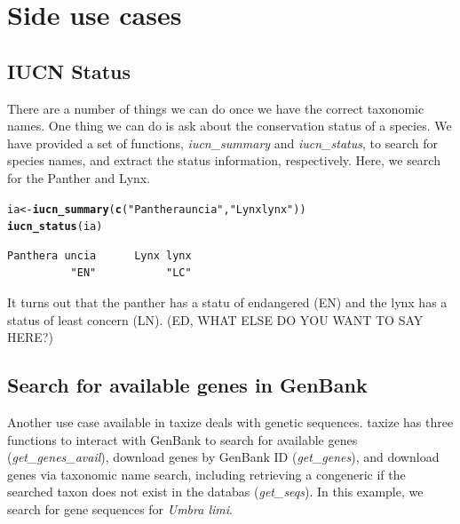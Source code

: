 \documentclass[letterpaper,superscriptaddress,showkeys,longbibliography,10pt]{revtex4-1}\usepackage{graphicx, color}
\makeatletter
\newcommand{\hlfunctioncall}[1]{\textcolor[rgb]{0.501960784313725,0,0.329411764705882}{\textbf{#1}}}%
\newcommand{\hlstring}[1]{\textcolor[rgb]{0.6,0.6,1}{#1}}%
\newenvironment{kframe}{%
 \def\at@end@of@kframe{}%
 \ifinner\ifhmode%
  \def\at@end@of@kframe{\end{minipage}}%
  \begin{minipage}{\columnwidth}%
 \fi\fi%
 \def\FrameCommand##1{\hskip\@totalleftmargin \hskip-\fboxsep
 \colorbox{shadecolor}{##1}\hskip-\fboxsep
     \hskip-\linewidth \hskip-\@totalleftmargin \hskip\columnwidth}%
 \MakeFramed {\advance\hsize-\width
   \@totalleftmargin\z@ \linewidth\hsize
   \@setminipage}}%
 {\par\unskip\endMakeFramed%
 \at@end@of@kframe}
\newenvironment{knitrout}{}{} %
\makeatother
\begin{document}
\section{Side use cases}
\subsection{IUCN Status}

There are a number of things we can do once we have the correct taxonomic names. One thing we can do is ask about the conservation status of a species. We have provided a set of functions, \emph{iucn\_summary} and \emph{iucn\_status}, to search for species names, and extract the status information, respectively. Here, we search for the Panther and Lynx.  

\begin{knitrout}
\color{fgcolor}\begin{kframe}
\begin{alltt}
ia <- \hlfunctioncall{iucn_summary}(\hlfunctioncall{c}(\hlstring{"Panthera uncia"}, \hlstring{"Lynx lynx"}))
\hlfunctioncall{iucn_status}(ia)
\end{alltt}
\begin{verbatim}
Panthera uncia      Lynx lynx 
          "EN"           "LC" 
\end{verbatim}
\end{kframe}
\end{knitrout}


It turns out that the panther has a statu of endangered (EN) and the lynx has a status of least concern (LN). (ED, WHAT ELSE DO YOU WANT TO SAY HERE?)

\subsection{Search for available genes in GenBank}

Another use case available in taxize deals with genetic sequences. taxize has three functions to interact with GenBank to search for available genes (\emph{get\_genes\_avail}), download genes by GenBank ID (\emph{get\_genes}), and download genes via taxonomic name search, including retrieving a congeneric if the searched taxon does not exist in the databas (\emph{get\_seqs}). In this example, we search for gene sequences for \emph{Umbra limi}.
\end{document}
